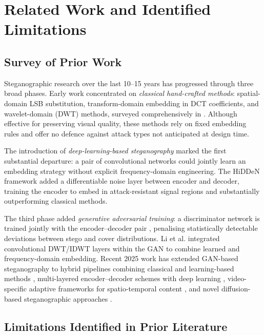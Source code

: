 \documentclass[conference]{IEEEtran}
\begin{document}
\section{Related Work and Identified Limitations}

\subsection{Survey of Prior Work}

Steganographic research over the last 10–15 years has progressed
through three broad phases. Early work concentrated on
\textit{classical hand-crafted methods}: spatial-domain LSB
substitution, transform-domain embedding in DCT coefficients, and
wavelet-domain (DWT) methods, surveyed comprehensively in
\cite{b9}. Although effective for preserving visual quality, these
methods rely on fixed embedding rules and offer no defence against
attack types not anticipated at design time.

The introduction of \textit{deep-learning-based steganography}
\cite{b10} marked the first substantial departure: a pair of
convolutional networks could jointly learn an embedding strategy
without explicit frequency-domain engineering. The HiDDeN framework
\cite{b8} added a differentiable noise layer between encoder and
decoder, training the encoder to embed in attack-resistant signal
regions and substantially outperforming classical methods.

The third phase added \textit{generative adversarial training}: a
discriminator network is trained jointly with the encoder–decoder
pair \cite{b11}, penalising statistically detectable deviations
between stego and cover distributions. Li et al.
\cite{b7} integrated convolutional DWT/IDWT layers within the GAN to
combine learned and frequency-domain embedding. Recent 2025 work has
extended GAN-based steganography to hybrid pipelines combining
classical and learning-based methods \cite{b2}, multi-layered
encoder–decoder schemes with deep learning \cite{b5}, video-specific
adaptive frameworks for spatio-temporal content \cite{b3}, and
novel diffusion-based steganographic approaches \cite{b1}.

\subsection{Limitations Identified in Prior Literature}
\end{document}
